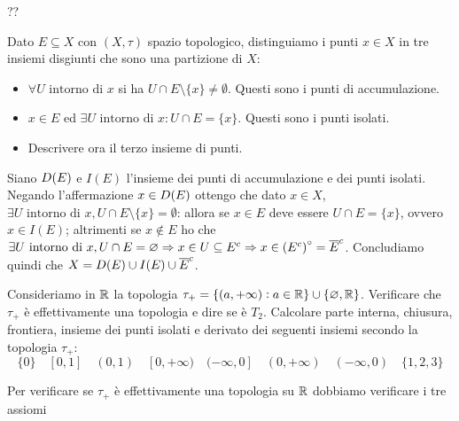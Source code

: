 \documentclass[a4paper]{article}\par \usepackage{style}\par
\begin{document}
??\par \begin{es}
  Dato $ E \subseteq X $ con $ (X, \tau) $ spazio topologico, distinguiamo i punti $ x \in X $ in tre insiemi disgiunti che sono una partizione di $ X $:
  \begin{itemize}
  \item $ \forall U \text{ intorno di } x $ si ha $ U \cap E \setminus \{x\} \neq \emptyset $. Questi sono i punti di accumulazione.
  \item $ x \in E $ ed $ \exists U \text{ intorno di } x : U \cap E = \{x\} $. Questi sono i punti isolati.
  \item Descrivere ora il terzo insieme di punti.
  \end{itemize}
\end{es}\par Siano $ D{(E)} $ e $ I(E) $ l'insieme dei punti di accumulazione e dei punti isolati. Negando l'affermazione $ x \in D{(E)} $ ottengo che dato $ x \in X $, $ \exists U \text{ intorno di } x, U \cap E \setminus \{x\} =\emptyset $: allora se $ x \in E $ deve essere $ U \cap E = \{x\} $, ovvero $ x \in I(E) $; altrimenti se $ x \notin E $ ho che $ \exists U \text{ intorno di } x, U \cap E =\varnothing \Rightarrow x \in U \subseteq E^c \Rightarrow x \in {(E^c)}^{\circ} = \overline{E}^c $. Concludiamo quindi che $ X = D{(E)} \cup I(E) \cup \overline{E}^c $.\par \begin{es} \label{es:tau_+}
  Consideriamo in $ \mathbb{R} $ la topologia $ \tau_+ = \{(a, +\infty) : a \in \mathbb{R}\} \cup \{\varnothing, \mathbb{R}\} $. Verificare che $ \tau_+ $ è effettivamente una topologia e dire se è $ T_2 $. Calcolare parte interna, chiusura, frontiera, insieme dei punti isolati e derivato dei seguenti insiemi secondo la topologia $ \tau_+ $: \[\{0\} \quad [0, 1] \quad (0, 1) \quad [0, +\infty) \quad (-\infty, 0] \quad (0, +\infty) \quad (-\infty, 0) \quad \{1, 2, 3\}\]
\end{es}\par Per verificare se $ \tau_+ $ è effettivamente una topologia su $ \mathbb{R} $ dobbiamo verificare i tre assiomi
\end{document}
